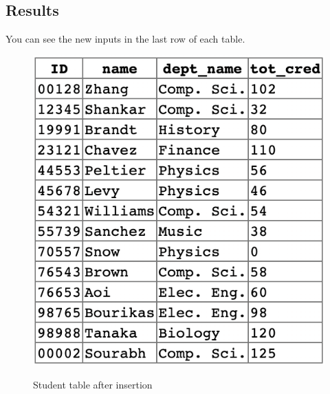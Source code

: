 \documentclass[12pt]{article}
\begin{document}
\subsection{Results}
You can see the new inputs in the last row of each table.

\begin{figure}[!hbt]
    \centering
    \includegraphics[scale=0.9]{screenshots/student.png}
    \label{fig:my_label1}
    \caption{Student table after insertion}
\end{figure}
\end{document}
